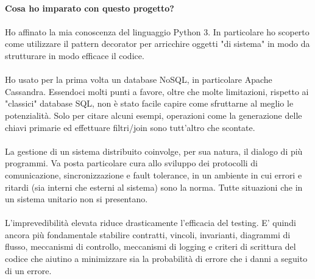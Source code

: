 \documentclass[11pt,a4paper,english]{article}
\begin{document}
\paragraph{Cosa ho imparato con questo progetto?}

\paragraph{} Ho affinato la mia conoscenza del linguaggio Python 3. In particolare ho scoperto come utilizzare il pattern decorator per arricchire oggetti "di sistema" in modo da strutturare in modo efficace il codice. 

\paragraph{} Ho usato per la prima volta un database NoSQL, in particolare Apache Cassandra. Essendoci molti punti a favore, oltre che molte limitazioni, rispetto ai "classici" database SQL, non è stato facile capire come sfruttarne al meglio le potenzialità. Solo per citare alcuni esempi, operazioni come la generazione delle chiavi primarie ed effettuare filtri/join sono tutt'altro che scontate. 

\paragraph{} La gestione di un sistema distribuito coinvolge, per sua natura, il dialogo di più programmi. Va posta particolare cura allo sviluppo dei protocolli di comunicazione, sincronizzazione e fault tolerance, in un ambiente in cui errori e ritardi (sia interni che esterni al sistema) sono la norma. Tutte situazioni che in un sistema unitario non si presentano. 

\paragraph{} L'imprevedibilità elevata riduce drasticamente l'efficacia del testing. E' quindi ancora più fondamentale stabilire contratti, vincoli, invarianti, diagrammi di flusso, meccanismi di controllo, meccanismi di logging e criteri di scrittura del codice che aiutino a minimizzare sia la probabilità di errore che i danni a seguito di un errore. 

\cite{adams1995hitchhiker}



\end{document}
